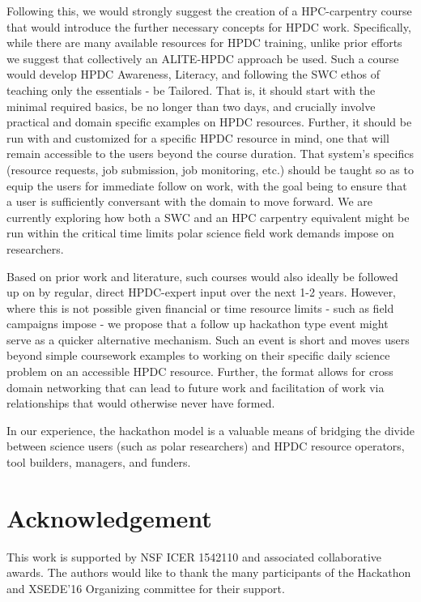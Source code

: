 \documentclass[conference]{IEEEtran}
\begin{document}
Following this, we would strongly suggest the creation of a HPC-carpentry course that would introduce the further necessary concepts for HPDC work. Specifically, while there are many available resources for HPDC training, unlike prior efforts we suggest that collectively an ALITE-HPDC approach be used.  Such a course would develop HPDC Awareness, Literacy, and following the SWC ethos of teaching only the essentials - be Tailored. That is, it should start with the minimal required basics, be no longer than two days, and crucially involve practical and domain specific examples on HPDC resources. Further, it should be run with and customized for a specific HPDC resource in mind, one that will remain accessible to the users beyond the course duration. That system's specifics (resource requests, job submission, job monitoring, etc.) should be taught so as to equip the users for immediate follow on work, with the goal being to ensure that a user is sufficiently conversant with the domain to move forward. We are currently exploring how both a SWC and an HPC carpentry equivalent might be run within the critical time limits polar science field work demands impose on researchers.  

Based on prior work and literature, such courses would also ideally be followed up on by regular, direct HPDC-expert input over the next 1-2 years. However, where this is not possible given financial or time resource limits - such as field campaigns impose - we propose that a follow up hackathon type event might serve as a quicker alternative mechanism. Such an event is short and moves users beyond simple coursework examples to working on their specific daily science problem on an accessible HPDC resource. Further, the format allows for cross domain networking that can lead to future work and facilitation of work via relationships that would otherwise never have formed.

In our experience, the hackathon model is a valuable means of bridging the divide between science users (such as polar researchers) and HPDC resource operators, tool builders, managers, and funders.  



\section*{Acknowledgement}
This work is supported by NSF ICER 1542110 and associated collaborative
awards. The authors would like to thank the many participants of the Hackathon
and XSEDE'16 Organizing committee for their support.
\end{document}
